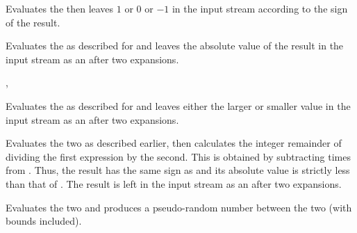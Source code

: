 \documentclass[oneside]{book}
\begin{document}
\begin{function}{\IntMathSign}
\begin{syntax}
 
\end{syntax}
Evaluates the  then leaves $1$ or $0$ or
$-1$ in the input stream according to the sign of the result.
\end{function}

\begin{function}{\IntMathAbs}
\begin{syntax}
 
\end{syntax}
Evaluates the  as described for
 and leaves the absolute value of the result in
the input stream as an  after two
expansions.
\end{function}

\begin{function}{\IntMathMax,\IntMathMin}
\begin{syntax}
  
  
\end{syntax}
Evaluates the  as described for
 and leaves either the larger or smaller value
in the input stream as an  after two
expansions.
\end{function}

\begin{function}{\IntMathMod}
\begin{syntax}
  
\end{syntax}
Evaluates the two  as described earlier,
then calculates the integer remainder of dividing the first
expression by the second.  This is obtained by subtracting
   times
 from .  Thus, the result has the
same sign as  and its absolute value is strictly
less than that of .  The result is left in the input
stream as an  after two expansions.
\end{function}

\begin{function}{\IntMathRand}
\begin{syntax}
  
\end{syntax}
Evaluates the two  and produces a
pseudo-random number between the two (with bounds included).
\end{function}
\end{document}
